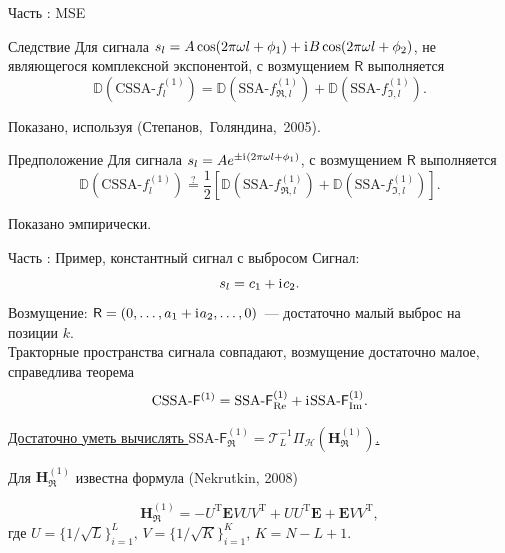 \documentclass[10pt, ucs, notheorems, handout]{beamer}
\newcommand{\tX}[1]{\mathsf{#1}}
\newcommand{\iu}{\mathrm{i}\mkern1mu}
\newcommand{\RomanNumeralCaps}[1]
{\MakeUppercase{\romannumeral #1}}
\begin{document}
\begin{frame}{Часть \RomanNumeralCaps{2}: MSE}
\begin{block}{Следствие}
    Для сигнала $s_l = A\cos(2 \pi\omega l + \phi_1) + \iu B\cos(2 \pi\omega l + \phi_2)$, не являющегося комплексной экспонентой, с возмущением $\tX{R}$ выполняется
    $$\mathbb{D}(\text{CSSA-}f^{(1)}_l) = \mathbb{D}(\text{SSA-}f^{(1)}_{\Re, l}) + \mathbb{D}(\text{SSA-}f^{(1)}_{\Im, l}).$$
\end{block}

Показано, используя (Степанов,~Голяндина,~2005).

\begin{block}{Предположение}
    Для сигнала $s_l = Ae^{\pm \iu(2 \pi\omega l + \phi_1)}$, с возмущением $\tX{R}$ выполняется
    $$\mathbb{D}(\text{CSSA-}f^{(1)}_l) \stackrel{?}{=} \frac{1}{2}[\mathbb{D}(\text{SSA-}f^{(1)}_{\Re, l}) + \mathbb{D}(\text{SSA-}f^{(1)}_{\Im, l})].$$
\end{block}
Показано эмпирически.
\end{frame}

\begin{frame}{Часть \RomanNumeralCaps{2}: Пример, константный сигнал с выбросом}
\alert{Сигнал:}
$$s_l = c_1 + \iu c_2.$$
\alert{Возмущение:} $\tX{R} = (0, \ldots, a_1 + \iu a_2, \ldots, 0)$~--- достаточно малый выброс на позиции $k$.\\
\vspace{1em}
Тракторные пространства сигнала совпадают, возмущение достаточно малое, справедлива теорема $$\text{CSSA-}\tX{F}^{(1)} = \text{SSA-}\tX{F}^{(1)}_{\Re} + \iu\text{SSA-}\tX{F}^{(1)}_{\Im}.$$

\vspace{1em}
\underline{Достаточно уметь вычислять $\text{SSA-}\tX{F}^{(1)}_{\Re} = \mathcal{T}_L^{-1} \Pi_{\mathcal{H}}(\mathbf{H}^{(1)}_{\Re})$.}

\vspace{1em}
Для $\mathbf{H}^{(1)}_{\Re}$ известна формула (Nekrutkin, 2008)

$$\mathbf{H}^{(1)}_{\Re} = -U^{\mathrm{T}} \mathbf{E} V U V^{\mathrm{T}} + U U^{\mathrm{T}} \mathbf{E} + \mathbf{E} V V^{\mathrm{T}},$$
где $U = \{1/\sqrt{L}\}^{L}_{i = 1},\, V = \{1/\sqrt{K}\}^{K}_{i = 1}$, $K = N - L + 1$.
\end{frame}
\end{document}

